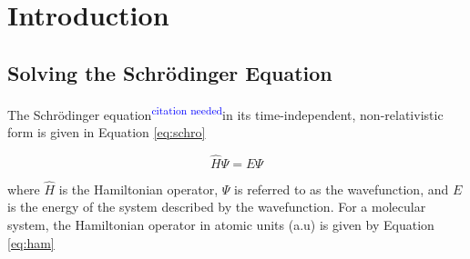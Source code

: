 \documentclass[12pt]{report}
\newcommand{\citethis}{\textsuperscript{\textcolor{blue}{citation needed}}} %
\begin{document}
%
%
%
%
%
%
%
%
%
%
%
%
%
%
%
%
%
%
%
%
%
%
%
%
%
%
%
%
%
%
%
%
%
%
%
%
%
%
%

\bodyoftext

\chapter{Introduction}
\section{Solving the Schr\"{o}dinger Equation}
The Schr\"{o}dinger equation\citethis in its time-independent, non-relativistic form is given in Equation \ref{eq:schro} 

\begin{equation}
\label{eq:schro}
\hat{H}\Psi = E\Psi
\end{equation} 

where $\hat{H}$ is the Hamiltonian operator, $\Psi$ is referred to as the wavefunction, and $E$ is the energy of the system described by the wavefunction. For a molecular system, the Hamiltonian operator in atomic units (a.u) is given by Equation \ref{eq:ham}
\end{document}
